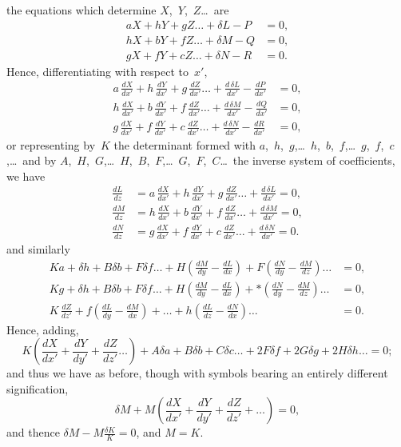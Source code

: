 \documentclass[11pt,a4paper]{book}
\begin{document}
\newpage
the equations which determine $X$,~$Y$,~$Z$\ldots\ are
\begin{align*}
aX + hY + gZ\ldots + \delta L - P &= 0,\\
hX + bY + fZ\ldots + \delta M - Q &= 0,\\
gX + fY + cZ\ldots + \delta N - R &= 0.
\end{align*}
Hence, differentiating with respect to~$x'$,
\begin{align*}
a\,\frac{dX}{dx'} + h\,\frac{dY}{dx'} + g\,\frac{dZ}{dx'}\ldots + \frac{d\,\delta L}{dx'} - \frac{dP}{dx'} &= 0,\\
h\,\frac{dX}{dx'} + b\,\frac{dY}{dx'} + f\,\frac{dZ}{dx'}\ldots + \frac{d\,\delta M}{dx'} - \frac{dQ}{dx'} &= 0,\\
g\,\frac{dX}{dx'} + f\,\frac{dY}{dx'} + c\,\frac{dZ}{dx'}\ldots + \frac{d\,\delta N}{dx'} - \frac{dR}{dx'} &= 0,
\end{align*}
or representing by~$K$ the determinant formed with $a$,~$h$,~$g$,\ldots\ $h$,~$b$,~$f$,\ldots\ $g$,~$f$,~$c$,\ldots\ and by $A$,~$H$,~$G$,\ldots\ $H$,~$B$,~$F$,\ldots\ $G$,~$F$,~$C$\ldots\ the inverse system of coefficients, we have
\begin{align*}
\frac{dL}{dz} &= a\,\frac{dX}{dx'} + h\,\frac{dY}{dx'} + g\,\frac{dZ}{dx'}\ldots + \frac{d\,\delta L}{dx'} = 0,\\
\frac{dM}{dz} &= h\,\frac{dX}{dx'} + b\,\frac{dY}{dx'} + f\,\frac{dZ}{dx'}\ldots + \frac{d\,\delta M}{dx'} = 0,\\
\frac{dN}{dz} &= g\,\frac{dX}{dx'} + f\,\frac{dY}{dx'} + c\,\frac{dZ}{dx'}\ldots + \frac{d\,\delta N}{dx'} = 0.
\end{align*}
and similarly
\begin{align*}
Ka + \delta h + B\delta b + F\delta f\ldots + H\left(\frac{dM}{dy} - \frac{dL}{dx}\right) + F\left(\frac{dN}{dy} - \frac{dM}{dz}\right)\ldots &= 0,\\
Kg + \delta h + B\delta b + F\delta f\ldots + H\left(\frac{dM}{dy} - \frac{dL}{dx}\right) + *\left(\frac{dN}{dy} - \frac{dM}{dz}\right)\ldots &= 0,\\
K\,\frac{dZ}{dz'} + f\left(\frac{dL}{dy} - \frac{dM}{dx}\right) + \ldots + h\left(\frac{dL}{dz} - \frac{dN}{dx}\right)\ldots &= 0.
\end{align*}
Hence, adding,
\[
K\left(\frac{dX}{dx'} + \frac{dY}{dy'} + \frac{dZ}{dz'}\ldots\right) + A\delta a + B\delta b + C\delta c\ldots + 2F\delta f + 2G\delta g + 2H\delta h\ldots = 0;
\]
and thus we have as before, though with symbols bearing an entirely different signification,
\[
\delta M + M\left(\frac{dX}{dx'} + \frac{dY}{dy'} + \frac{dZ}{dz'} + \ldots\right) = 0,
\]
and thence $\delta M - M\frac{\delta K}{K} = 0$, and $M = K$.
\end{document}
